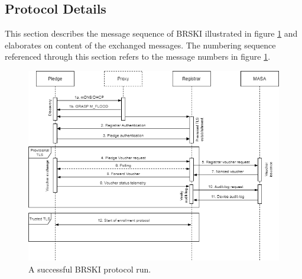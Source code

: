 \subsection{Protocol Details}
This section describes the message sequence of BRSKI illustrated in figure \ref{brski-protocol} and elaborates on content of the exchanged messages. The numbering sequence referenced through this section refers to the message numbers in figure \ref{brski-protocol}.

\begin{figure}[htbp]
	\centering
	\includegraphics[scale=0.4]{Images/brski-architecture.png}
	\caption{A successful BRSKI protocol run.}
	\label{brski-protocol}
\end{figure}

